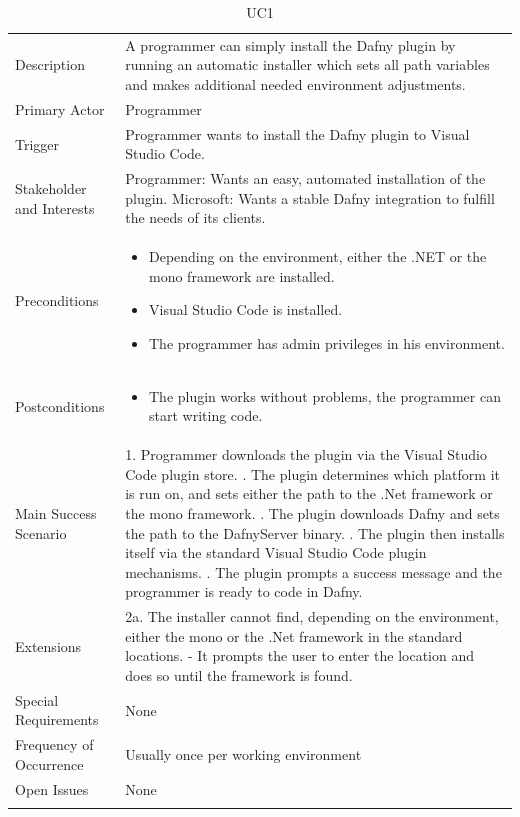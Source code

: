 \begin{longtable}{l | p{} }
	Description & A programmer can simply install the Dafny plugin by running an automatic installer which sets all path variables and makes additional needed environment adjustments.\\ 
	Primary Actor & Programmer\\ 
	Trigger & Programmer wants to install the Dafny plugin to Visual Studio Code.\\ 
	Stakeholder and Interests & Programmer: Wants an easy, automated installation of the plugin. \newline Microsoft: Wants a stable Dafny integration to fulfill the needs of its clients.\\ 
	Preconditions &\begin{itemize}
		\item Depending on the environment, either the .NET or the mono framework are installed.
		\item Visual Studio Code is installed.
		\item The programmer has admin privileges in his environment.
	\end{itemize}\\ 
	Postconditions & 
	\begin{itemize}
		\item The plugin works without problems, the programmer can start writing code.
	\end{itemize} \\ 
	Main Success Scenario & 
	1. Programmer downloads the plugin via the Visual Studio Code plugin store. \newline
	2. The plugin determines which platform it is run on, and sets either the path to the .Net framework or the mono framework. \newline
	3. The plugin downloads Dafny and sets the path to the DafnyServer binary. \newline
	4. The plugin then installs itself via the standard Visual Studio Code plugin mechanisms. \newline
	5. The plugin prompts a success message and the programmer is ready to code in Dafny.\\
	Extensions & 
	2a. The installer cannot find, depending on the environment, either the mono or the .Net framework in the standard locations. \newline 
	- It prompts the user to enter the location and does so until the framework is found. \\ 
	Special Requirements & None\\ 
	Frequency of Occurrence & Usually once per working environment\\ 
	Open Issues & None \\ 
	\caption{UC1}
\end{longtable}

